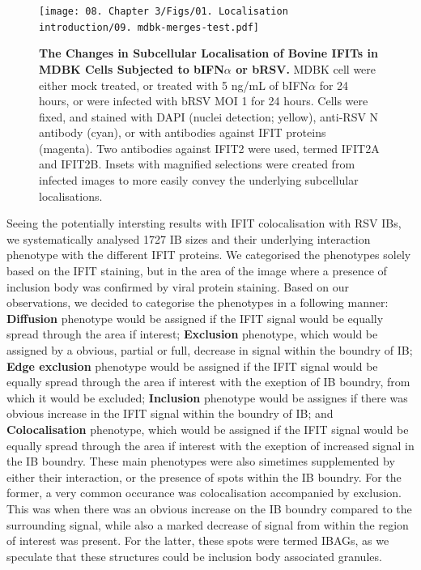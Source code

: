 \begin{figure}
    \centering
    \texttt{[image: 08. Chapter 3/Figs/01. Localisation introduction/09. mdbk-merges-test.pdf]}
    \caption[The Changes in Subcellular Localisation of Bovine IFITs in MDBK Cells Subjected to bIFN\(\alpha\) or bRSV.]{\textbf{The Changes in Subcellular Localisation of Bovine IFITs in MDBK Cells Subjected to bIFN\(\alpha\) or bRSV.} MDBK cell were either mock treated, or treated with 5 ng/mL of bIFN\(\alpha\) for 24 hours, or were infected with bRSV MOI 1 for 24 hours. Cells were fixed, and stained with DAPI (nuclei detection; yellow), anti-RSV N antibody (cyan), or with antibodies against IFIT proteins (magenta). Two antibodies against IFIT2 were used, termed IFIT2A and IFIT2B. Insets with magnified selections were created from infected images to more easily convey the underlying subcellular localisations.}
    \label{fig:The Changes in Subcellular Localisation of Bovine IFITs in MDBK Cells Subjected to bIFNa or bRSV}
\end{figure}

Seeing the potentially intersting results with IFIT colocalisation with RSV IBs, we systematically analysed 1727 IB sizes and their underlying interaction phenotype with the different IFIT proteins. We categorised the phenotypes solely based on the IFIT staining, but in the area of the image where a presence of inclusion body was confirmed by viral protein staining. Based on our observations, we decided to categorise the phenotypes in a following manner: \textbf{Diffusion} phenotype would be assigned if the IFIT signal would be equally spread through the area if interest; \textbf{Exclusion} phenotype, which would be assigned by a obvious, partial or full, decrease in signal within the boundry of IB; \textbf{Edge exclusion} phenotype would be assigned if the IFIT signal would be equally spread through the area if interest with the exeption of IB boundry, from which it would be excluded; \textbf{Inclusion} phenotype would be assignes if there was obvious increase in the IFIT signal within the boundry of IB; and \textbf{Colocalisation} phenotype, which would be assigned if the IFIT signal would be equally spread through the area if interest with the exeption of increased signal in the IB boundry. These main phenotypes were also simetimes supplemented by either their interaction, or the presence of spots within the IB boundry. For the former, a very common occurance was colocalisation accompanied by exclusion. This was when there was an obvious increase on the IB boundry compared to the surrounding signal, while also a marked decrease of signal from within the region of interest was present. For the latter, these spots were termed IBAGs, as we speculate that these structures could be inclusion body associated granules.

